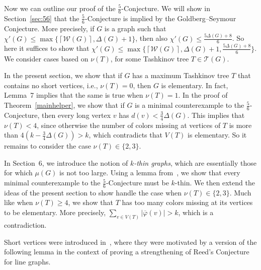 \documentclass[12pt]{amsart}
\theoremstyle{plain}
\theoremstyle{definition}
\theoremstyle{remark}
\newcommand{\fancy}[1]{\mathcal{#1}}
\newcommand{\W}{\fancy{W}}
\newcommand{\T}{\fancy{T}}
\newcommand{\ceil}[1]{\left\lceil#1\right\rceil}
\newcommand{\floor}[1]{\left\lfloor#1\right\rfloor}
\newcommand{\vphn}{\overline{\varphi}}
\begin{document}
Now we can outline our proof of the $\frac56$-Conjecture.
We will show in Section~\ref{sec:56} that the $\frac56$-Conjecture is implied
by the Goldberg--Seymour Conjecture.  More precisely, if $G$ is a graph
such that $\chi'(G)\le\max\{\ceil{\W(G)},\Delta(G)+1\}$, then also $\chi'(G)\le
\frac{5\Delta(G)+8}6$.  So here it suffices to show that 
$\chi'(G)\le\max\{\ceil{\W(G)},\Delta(G)+1,\frac{5\Delta(G)+8}6\}$.  We consider
cases based on $\nu(T)$, for some Tashkinov tree $T\in \T(G)$.

In the present section, we show that if $G$ has a maximum Tashkinov tree $T$ that contains
no short vertices, i.e., $\nu(T)=0$, then $G$ is elementary.  In fact, Lemma~7
implies that the same is true when $\nu(T)=1$.  In the proof of
Theorem~\ref{mainhelper}, we show that if $G$ is a minimal counterexample to
the $\frac56$-Conjecture, then every long vertex $v$ has
$d(v)<\frac34\Delta(G)$.  This implies that $\nu(T)< 4$, since otherwise
the number of colors missing at vertices of $T$ is more than
$4(k-\frac34\Delta(G))>k$, which contradicts that $V(T)$ is elementary.
So it remains to consider the case $\nu(T)\in\{2,3\}$.

In Section~6, we introduce the notion of \emph{$k$-thin graphs}, which are
essentially those for which $\mu(G)$ is not too large.  Using a lemma
from~\cite{rabern2011strengthening}, we show that every minimal counterexample to the
$\frac56$-Conjecture must be $k$-thin.  We then extend the ideas of the present
section to show handle the case when $\nu(T)\in\{2,3\}$.  Much like when
$\nu(T)\ge 4$, we show that $T$ has too many colors missing at its vertices to
be elementary.  More precisely, $\sum_{v\in V(T)}|\vphn(v)|>k$, which is a
contradiction.

Short vertices were introduced in~\cite{CKPS}, where they were motivated by a
version of the following lemma in the context of proving a strengthening of
Reed's Conjecture for line graphs.  
\end{document}
